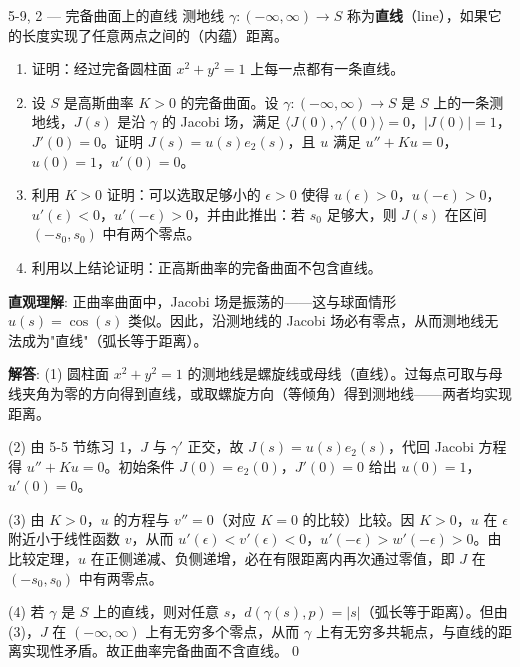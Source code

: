 \begin{exercise}{5-9, 2 — 完备曲面上的直线}
测地线 $\gamma: (-\infty, \infty) \to S$ 称为\textbf{直线}（line），如果它的长度实现了任意两点之间的（内蕴）距离。

\begin{enumerate}
\item 证明：经过完备圆柱面 $x^2 + y^2 = 1$ 上每一点都有一条直线。
\item 设 $S$ 是高斯曲率 $K > 0$ 的完备曲面。设 $\gamma: (-\infty, \infty) \to S$ 是 $S$ 上的一条测地线，$J(s)$ 是沿 $\gamma$ 的 Jacobi 场，满足 $\langle J(0), \gamma'(0) \rangle = 0$，$|J(0)| = 1$，$J'(0) = 0$。证明 $J(s) = u(s)e_2(s)$，且 $u$ 满足 $u'' + K u = 0$，$u(0) = 1$，$u'(0) = 0$。
\item 利用 $K > 0$ 证明：可以选取足够小的 $\epsilon > 0$ 使得 $u(\epsilon) > 0$，$u(-\epsilon) > 0$，$u'(\epsilon) < 0$，$u'(-\epsilon) > 0$，并由此推出：若 $s_0$ 足够大，则 $J(s)$ 在区间 $(-s_0, s_0)$ 中有两个零点。
\item 利用以上结论证明：正高斯曲率的完备曲面不包含直线。
\end{enumerate}
\end{exercise}
\begin{solution}
\textbf{直观理解}: 正曲率曲面中，Jacobi 场是振荡的——这与球面情形 $u(s)=\cos(s)$ 类似。因此，沿测地线的 Jacobi 场必有零点，从而测地线无法成为"直线"（弧长等于距离）。

\textbf{解答}: (1) 圆柱面 $x^2+y^2=1$ 的测地线是螺旋线或母线（直线）。过每点可取与母线夹角为零的方向得到直线，或取螺旋方向（等倾角）得到测地线——两者均实现距离。

(2) 由 5-5 节练习 1，$J$ 与 $\gamma'$ 正交，故 $J(s)=u(s)e_2(s)$，代回 Jacobi 方程得 $u''+Ku=0$。初始条件 $J(0)=e_2(0)$，$J'(0)=0$ 给出 $u(0)=1$，$u'(0)=0$。

(3) 由 $K>0$，$u$ 的方程与 $v''=0$（对应 $K=0$ 的比较）比较。因 $K>0$，$u$ 在 $\epsilon$ 附近小于线性函数 $v$，从而 $u'(\epsilon)<v'(\epsilon)<0$，$u'(-\epsilon)>w'(-\epsilon)>0$。由比较定理，$u$ 在正侧递减、负侧递增，必在有限距离内再次通过零值，即 $J$ 在 $(-s_0,s_0)$ 中有两零点。

(4) 若 $\gamma$ 是 $S$ 上的直线，则对任意 $s$，$d(\gamma(s),p)=|s|$（弧长等于距离）。但由 (3)，$J$ 在 $(-\infty,\infty)$ 上有无穷多个零点，从而 $\gamma$ 上有无穷多共轭点，与直线的距离实现性矛盾。故正曲率完备曲面不含直线。\qed
\end{solution}

